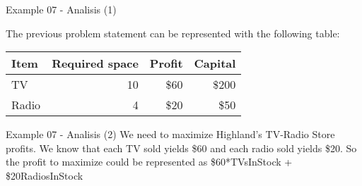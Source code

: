 \begin{frame}{Example 07 - Analisis (1)}

The previous problem statement can be represented with the following table:

\begin{center}
\begin{tabular}{lrrr}
\hline
  \cellcolor{gray90}\textbf{Item}
& \cellcolor{gray90}\textbf{Required space}
& \cellcolor{gray90}\textbf{Profit}
& \cellcolor{gray90}\textbf{Capital} \\
\hline
TV    & 10 & \$60 & \$200 \\
Radio &  4 & \$20 &  \$50 \\
\hline
\end{tabular}
\end{center}

\end{frame}

\begin{frame}{Example 07 - Analisis (2)}
We need to maximize Highland's TV-Radio Store profits. We know that
each TV sold yields \$60 and each radio sold yields \$20. So the profit
to maximize could be represented as \$60*TVsInStock + \$20RadiosInStock

\end{frame}
